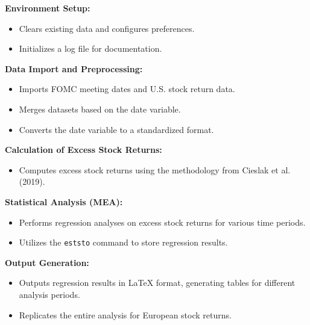 \textbf{Environment Setup:}
\begin{itemize}
    \item Clears existing data and configures preferences.
    \item Initializes a log file for documentation.
\end{itemize}

\textbf{Data Import and Preprocessing:}
\begin{itemize}
    \item Imports FOMC meeting dates and U.S. stock return data.
    \item Merges datasets based on the date variable.
    \item Converts the date variable to a standardized format.
\end{itemize}

\textbf{Calculation of Excess Stock Returns:}
\begin{itemize}
    \item Computes excess stock returns using the methodology from Cieslak et al. (2019).
\end{itemize}

\textbf{Statistical Analysis (MEA):}
\begin{itemize}
    \item Performs regression analyses on excess stock returns for various time periods.
    \item Utilizes the \texttt{eststo} command to store regression results.
\end{itemize}

\textbf{Output Generation:}
\begin{itemize}
    \item Outputs regression results in LaTeX format, generating tables for different analysis periods.
    \item Replicates the entire analysis for European stock returns.
\end{itemize}





